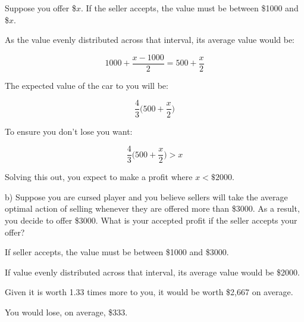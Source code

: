 \documentclass[
  letterpaper,
  DIV=11,
  numbers=noendperiod]{scrreprt}
\begin{document}
\begin{tcolorbox}[enhanced jigsaw, title=\textcolor{quarto-callout-tip-color}{\faLightbulb}\hspace{0.5em}{Answer}, toprule=.15mm, colback=white, breakable, titlerule=0mm, colframe=quarto-callout-tip-color-frame, coltitle=black, opacityback=0, rightrule=.15mm, colbacktitle=quarto-callout-tip-color!10!white, bottomtitle=1mm, opacitybacktitle=0.6, arc=.35mm, bottomrule=.15mm, toptitle=1mm, leftrule=.75mm, left=2mm]

Suppose you offer \$\(x\). If the seller accepts, the value must be
between \$1000 and \$\(x\).

As the value evenly distributed across that interval, its average value
would be:

\[
1000+\frac{x−1000}{2}=500+\frac{x}{2}
\]

The expected value of the car to you will be:

\[
\frac{4}{3}\bigg(500+\frac{x}{2}\bigg)
\]

To ensure you don't lose you want:

\[
\frac{4}{3}\bigg(500+\frac{x}{2}\bigg)>x
\]

Solving this out, you expect to make a profit where \(x<\$2000\).

\end{tcolorbox}

b) Suppose you are cursed player and you believe sellers will take the
average optimal action of selling whenever they are offered more than
\$3000. As a result, you decide to offer \$3000. What is your accepted
profit if the seller accepts your offer?

\begin{tcolorbox}[enhanced jigsaw, title=\textcolor{quarto-callout-tip-color}{\faLightbulb}\hspace{0.5em}{Answer}, toprule=.15mm, colback=white, breakable, titlerule=0mm, colframe=quarto-callout-tip-color-frame, coltitle=black, opacityback=0, rightrule=.15mm, colbacktitle=quarto-callout-tip-color!10!white, bottomtitle=1mm, opacitybacktitle=0.6, arc=.35mm, bottomrule=.15mm, toptitle=1mm, leftrule=.75mm, left=2mm]

If seller accepts, the value must be between \$1000 and \$3000.

If value evenly distributed across that interval, its average value
would be \$2000.

Given it is worth 1.33 times more to you, it would be worth \$2,667 on
average.

You would lose, on average, \$333.

\end{tcolorbox}
\end{document}
